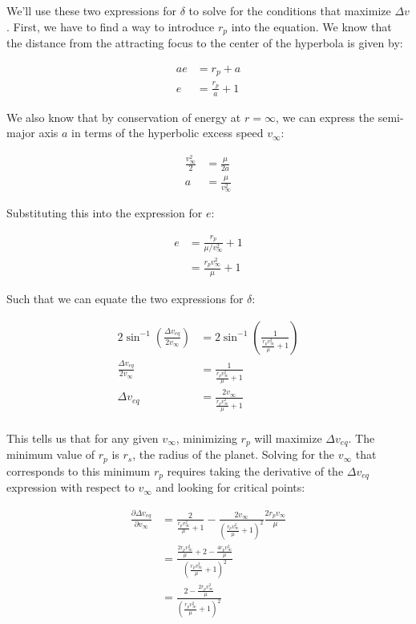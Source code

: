 We'll use these two expressions for $\delta$ to solve for the conditions that maximize $\Delta v$. First, we have to find a way to introduce $r_p$ into the equation. We know that the distance from the attracting focus to the center of the hyperbola is given by:

\begin{align*}
    ae &= r_p + a \\
    e &= \frac{r_p}{a} + 1
\end{align*}

We also know that by conservation of energy at $r=\infty$, we can express the semi-major axis $a$ in terms of the hyperbolic excess speed $v_\infty$:

\begin{align*}
    \frac{v_\infty^2}{2} &= \frac{\mu}{2a} \\
    a &= \frac{\mu}{v_\infty^2}
\end{align*}

Substituting this into the expression for $e$:

\begin{align*}
    e &= \frac{r_p}{\mu/v_\infty^2} + 1 \\
    &= \frac{r_p v_\infty^2}{\mu} + 1
\end{align*}

Such that we can equate the two expressions for $\delta$:

\begin{align*}
    2 \sin^{-1} \left( \frac{\Delta v_{eq}}{2 v_\infty} \right) &= 2 \sin^{-1} \left( \frac{1}{\frac{r_p v_\infty^2}{\mu} + 1} \right) \\
    \frac{\Delta v_{eq}}{2 v_\infty} &= \frac{1}{\frac{r_p v_\infty^2}{\mu} + 1} \\
    \Delta v_{eq} &= \frac{2 v_\infty}{\frac{r_p v_\infty^2}{\mu} + 1} \\
\end{align*}

This tells us that for any given $v_\infty$, minimizing $r_p$ will maximize $\Delta v_{eq}$. The minimum value of $r_p$ is $r_s$, the radius of the planet. Solving for the $v_\infty$ that corresponds to this minimum $r_p$ requires taking the derivative of the $\Delta v_{eq}$ expression with respect to $v_\infty$ and looking for critical points:

\begin{align*}
    \frac{\partial \Delta v_{eq}}{\partial v_\infty} &= \frac{2}{\frac{r_p v_\infty^2}{\mu} + 1} - \frac{2 v_\infty}{\left( \frac{r_p v_\infty^2}{\mu} + 1 \right)^2} \frac{2 r_p v_\infty}{\mu} \\
    &= \frac{\frac{2r_p v_\infty^2}{\mu} + 2 - \frac{4r_p v_\infty^2}{\mu}}{\left( \frac{r_p v_\infty^2}{\mu} + 1 \right)^2} \\
    &= \frac{2 - \frac{2r_p v_\infty^2}{\mu}}{\left( \frac{r_p v_\infty^2}{\mu} + 1 \right)^2} \\
\end{align*}

